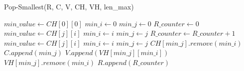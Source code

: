 \documentclass[11pt]{article}
\begin{document}
\begin{algorithm}[H]
\caption{Pop-Smallest(R, C, V, CH, VH, len\_max)}\label{pop}
    \begin{algorithmic}[1]
        \State $min\_value \gets CH[0][0]$
        \State $min\_i \gets 0$
        \State $min\_j \gets 0$
            \State $R\_counter \gets 0$
                    \State $min\_value \gets CH[j][i]$
                    \State $min\_i \gets i$
                    \State $min\_j \gets j$
                    \State {}
                \EndIf
                    \State $R\_counter \gets R\_counter + 1$
                        \State $min\_value \gets CH[j][i]$
                        \State $min\_i \gets i$
                        \State $min\_j \gets j$
                    \EndIf
                \EndIf
            \EndFor
            \State $CH[min\_j].remove(min\_i)$
            \State $C.append(min\_j)$
            \State $V.append(VH[min\_j][min\_i])$
            \State $VH[min\_j].remove(min\_i)$
            \State $R.append(R\_counter)$
        \EndFor
    \end{algorithmic}
\end{algorithm}

%
% 
% 
\end{document}
